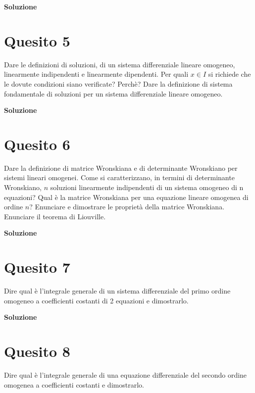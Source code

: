 \medskip
\begin{large}
\textbf{Soluzione}
\end{large}


\section*{Quesito 5}
Dare le definizioni di soluzioni, di un sistema differenziale lineare omogeneo,
linearmente indipendenti e linearmente dipendenti. Per quali $x \in I$ si richiede che le
dovute condizioni siano verificate? Perchè? Dare la definizione di sistema fondamentale
di soluzioni per un sistema differenziale lineare omogeneo.


\medskip
\begin{large}
\textbf{Soluzione}
\end{large}


\section*{Quesito 6}
Dare la definizione di matrice Wronskiana e di determinante Wronskiano per
sistemi lineari omogenei. Come si caratterizzano, in termini di determinante Wronskiano,
$n$ soluzioni linearmente indipendenti di un sistema omogeneo di n equazioni? Qual è
la matrice Wronskiana per una equazione lineare omogenea di ordine $n$? Enunciare e
dimostrare le proprietà della matrice Wronskiana. Enunciare il teorema di Liouville.

\medskip
\begin{large}
\textbf{Soluzione}
\end{large}


\section*{Quesito 7}
Dire qual è l’integrale generale di un sistema differenziale del primo ordine
omogeneo a coefficienti costanti di 2 equazioni e dimostrarlo.


\medskip
\begin{large}
\textbf{Soluzione}
\end{large}


\section*{Quesito 8}
Dire qual è l’integrale generale di una equazione differenziale del secondo
ordine omogenea a coefficienti costanti e dimostrarlo.

